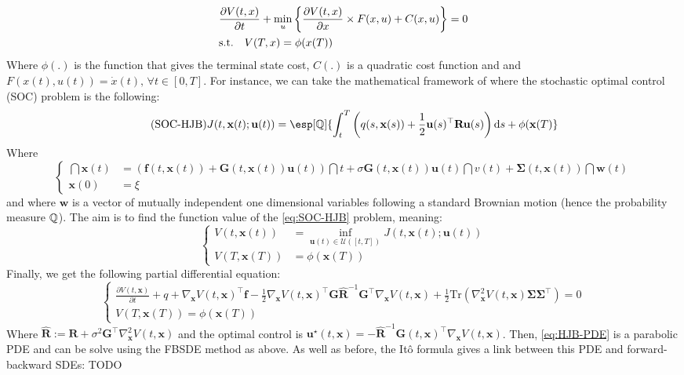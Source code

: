 \documentclass{article}
\begin{document}
$$
\begin{aligned}
&\frac{\partial V(t,x)}{\partial t} + \min_u\left\lbrace \frac{\partial V(t,x)}{\partial x}\times F(x,u) + C(x,u) \right\rbrace = 0\\
&\mathrm{s.t.} \quad V(T,x) = \phi(x(T))
\end{aligned}
$$
Where $\phi(.)$ is the function that gives the terminal state cost, $C(.)$ is a quadratic cost function and and $F(x(t),u(t)) = \dot{x}(t),\, \forall t \in [0,T]$. For instance, we can take the mathematical framework of \citeauthor{pereira2019deep} \citeyear{pereira2019deep} where the stochastic optimal control (SOC) problem is the following:
\begin{equation}\label{eq:SOC-HJB}\tag{SOC-HJB}
    J(t,\mathbf{x}(t);\mathbf{u}(t)) = \esp[\Q]{\int_t^T\pars{q(s,\mathbf{x}(s)) + \frac{1}{2}\mathbf{u}(s)^\top\mathbf{R}\mathbf{u}(s)}\dint s + \phi(\mathbf{x}(T)}
\end{equation}
Where
$$
\left\{\begin{array}{ll}
  \dint\mathbf{x}(t) & = (\mathbf{f}(t,\mathbf{x}(t)) + \mathbf{G}(t,\mathbf{x}(t))\mathbf{u}(t))\dint t + \sigma \mathbf{G}(t,\mathbf{x}(t))\mathbf{u}(t)\dint v(t) + \mathbf{\Sigma}(t,\mathbf{x}(t))\dint \mathbf{w}(t) \\
    \mathbf{x}(0) & = \xi
\end{array}\right.
$$
and where $\mathbf{w}$ is a vector of mutually independent one dimensional variables following a standard Brownian motion (hence the probability measure $\mathbb{Q}$). The aim is to find the function value of the \ref{eq:SOC-HJB} problem, meaning:
$$
\left\{\begin{array}{ll}
 V(t,\mathbf{x}(t))  & = \inf_{\mathbf{u}(t)\in\mathcal{U}([t,T])} J(t,\mathbf{x}(t);\mathbf{u}(t))  \\
  V(T,\mathbf{x}(T)) & = \phi(\mathbf{x}(T))
\end{array}\right.
$$
Finally, we get the following partial differential equation:
\begin{equation}\label{eq:HJB-PDE}\tag{PDE-HJB}
    \left\{\begin{array}{ll}
     \frac{\partial V(t,\mathbf{x})}{\partial t} + q + \nabla_\mathbf{x}V(t,\mathbf{x})^\top \mathbf{f} - \frac{1}{2}\nabla_\mathbf{x}V(t,\mathbf{x})^\top \mathbf{G}\hat{\mathbf{R}}^{-1}\mathbf{G}^\top \nabla_\mathbf{x}V(t,\mathbf{x}) + \frac{1}{2}\mathrm{Tr}(\nabla_\mathbf{x}^2 V(t,\mathbf{x})\mathbf{\Sigma}\mathbf{\Sigma}^\top) = 0 \\
      V(T,\mathbf{x}(T))  = \phi(\mathbf{x}(T))
    \end{array}\right.
\end{equation}
Where $\hat{\mathbf{R}} := \mathbf{R} + \sigma^2 \mathbf{G}^\top \nabla_\mathbf{x}^2 V(t,\mathbf{x})$ and the optimal control is $\mathbf{u}^\star(t,\mathbf{x}) =  - \hat{\mathbf{R}}^{-1}\mathbf{G}(t,\mathbf{x})^\top \nabla_\mathbf{x}V(t,\mathbf{x})$. Then, \ref{eq:HJB-PDE} is a parabolic PDE and can be solve using the FBSDE method as above. As well as before, the Itô formula gives a link between this PDE and forward-backward SDEs: TODO
\end{document}
